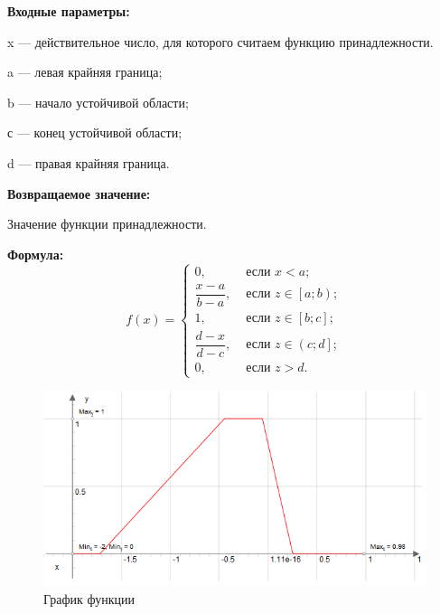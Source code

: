 \textbf{Входные параметры:}
  
x --- действительное число, для которого считаем функцию принадлежности.
 
a --- левая крайняя граница;
 
b --- начало устойчивой области;
 
с --- конец устойчивой области;
 
d --- правая крайняя граница.

\textbf{Возвращаемое значение:}
 
Значение функции принадлежности.

\textbf{Формула:}
\begin{equation*}
f\left(x \right)=\left\lbrace \begin{aligned}  0,& \text{ если } x < a   ; \\\dfrac{x-a}{b-a},& \text{ если } z \in \left[ a; b\right)   ; \\1,& \text{ если } z \in \left[ b; c\right] ; \\\dfrac{d-x}{d-c},& \text{ если } z \in \left( c; d\right]   ; \\ 0,& \text{ если } z >d. \end{aligned}\right.
\end{equation*}

 \begin{figure} [h] 
   \center
   \includegraphics {MHL_TrapeziformFuzzyNumber_Graph.png}
   \caption{График функции} 
   \label{img:MHL_TrapeziformFuzzyNumber_Graph}  
 \end{figure}
